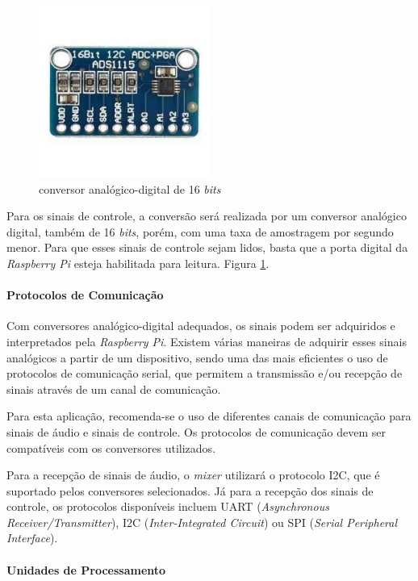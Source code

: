 \begin{figure}[h]
    \centering
    \includegraphics[width=0.5\textwidth]{figuras/fig64.jpg}
    \caption{conversor analógico-digital de 16 \textit{bits} \cite{eletroniklvEletronikComponentes}}
    \label{fig64}
\end{figure}

Para os sinais de controle, a conversão será realizada por um conversor analógico digital, também de 16 \textit{bits}, porém, com uma taxa de amostragem por segundo menor. Para que esses sinais de controle sejam lidos, basta que a porta digital da \textit{Raspberry Pi} esteja habilitada para leitura. Figura \ref{fig64}.

\paragraph{Protocolos de Comunicação}
Com conversores analógico-digital adequados, os sinais podem ser adquiridos e interpretados pela \textit{Raspberry Pi}. Existem várias maneiras de adquirir esses sinais analógicos a partir de um dispositivo, sendo uma das mais eficientes o uso de protocolos de comunicação serial, que permitem a transmissão e/ou recepção de sinais através de um canal de comunicação.

Para esta aplicação, recomenda-se o uso de diferentes canais de comunicação para sinais de áudio e sinais de controle. Os protocolos de comunicação devem ser compatíveis com os conversores utilizados.

Para a recepção de sinais de áudio, o \textit{mixer} utilizará o protocolo I2C, que é suportado pelos conversores selecionados. Já para a recepção dos sinais de controle, os protocolos disponíveis incluem UART (\textit{Asynchronous Receiver/Transmitter}), I2C (\textit{Inter-Integrated Circuit}) ou SPI (\textit{Serial Peripheral Interface}).

\paragraph{Unidades de Processamento}


